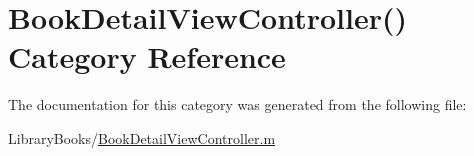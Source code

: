 \hypertarget{category_book_detail_view_controller_07_08}{}\section{Book\+Detail\+View\+Controller() Category Reference}
\label{category_book_detail_view_controller_07_08}


The documentation for this category was generated from the following file\+:\begin{DoxyCompactItemize}
\item 
Library\+Books/\hyperlink{_book_detail_view_controller_8m}{Book\+Detail\+View\+Controller.\+m}\end{DoxyCompactItemize}
